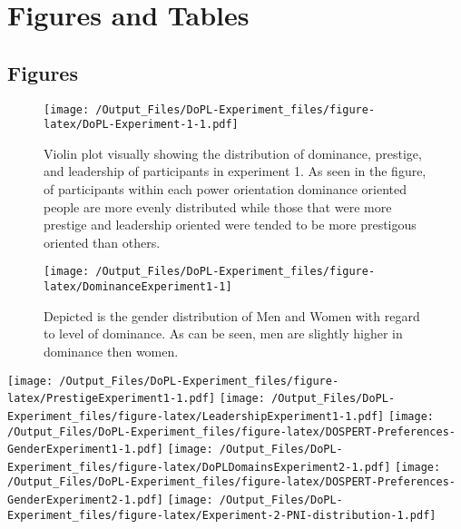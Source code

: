 \documentclass[
  donotrepeattitle,doc, 12pt, a4paper,floatsintext]{apa7}
\begin{document}
\endgroup



\newpage

\hypertarget{figures-and-tables}{%
\section{Figures and Tables}\label{figures-and-tables}}

\hypertarget{figures}{%
\subsection{Figures}\label{figures}}

\begin{figure}
\centering
\texttt{[image: /Output\_Files/DoPL-Experiment\_files/figure-latex/DoPL-Experiment-1-1.pdf]}
\caption{\label{fig:DoPL-Experiment-1}Violin plot visually showing the distribution of dominance, prestige, and leadership of participants in experiment 1. As seen in the figure, of participants within each power orientation dominance oriented people are more evenly distributed while those that were more prestige and leadership oriented were tended to be more prestigous oriented than others.}
\end{figure}

\begin{figure}

{\centering \texttt{[image: /Output\_Files/DoPL-Experiment\_files/figure-latex/DominanceExperiment1-1]} 

}

\caption{Depicted is the gender distribution of Men and Women with regard to level of dominance. As can be seen, men are slightly higher in dominance then women.}\label{fig:DominanceExperiment1}
\end{figure}

\texttt{[image: /Output\_Files/DoPL-Experiment\_files/figure-latex/PrestigeExperiment1-1.pdf]}
\texttt{[image: /Output\_Files/DoPL-Experiment\_files/figure-latex/LeadershipExperiment1-1.pdf]}
\texttt{[image: /Output\_Files/DoPL-Experiment\_files/figure-latex/DOSPERT-Preferences-GenderExperiment1-1.pdf]}
\texttt{[image: /Output\_Files/DoPL-Experiment\_files/figure-latex/DoPLDomainsExperiment2-1.pdf]}
\texttt{[image: /Output\_Files/DoPL-Experiment\_files/figure-latex/DOSPERT-Preferences-GenderExperiment2-1.pdf]}
\texttt{[image: /Output\_Files/DoPL-Experiment\_files/figure-latex/Experiment-2-PNI-distribution-1.pdf]}
\newpage
\end{document}
